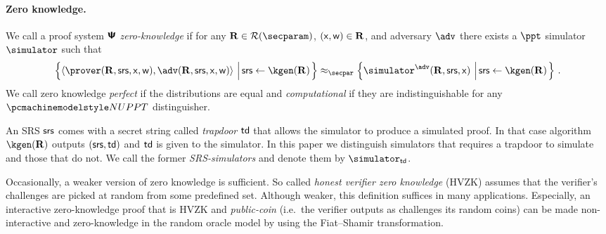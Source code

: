 \documentclass[runningheads,11pt]{llncs}
\begin{document}
 \paragraph{Zero knowledge.}
 We call a proof system $\bm{\mathsf{\Psi}}$ \emph{zero-knowledge} if for any
 $\REL \in \RELGEN(\secparam)$, $(\mathsf{x}, \mathsf{w}) \in \mathbf{R}$, and adversary $\adv$
 there exists a $\ppt$ simulator $\simulator$ such that
	\begin{multline*}
	  \left\{\ip{\prover(\REL, \srs, \inp, \wit)}{\adv(\REL, \srs, \inp, \wit)}
      \,\left|\, \srs \gets \kgen(\REL)\COMMENT{, (\inp, \wit) \gets \adv(\REL,
          \srs)}\vphantom{\simulator^\adv}\right.\right\} \approx_\secpar
		\left\{\simulator^{\adv}(\REL, \srs, \inp)\,\left|\, \srs \gets
        \kgen(\REL)\COMMENT{, (\inp, \wit) \gets \adv(\REL,
          \srs)}\vphantom{\simulator^\adv}\right.\right\}\,.
\end{multline*}
We call zero knowledge \emph{perfect} if the distributions are equal and
\emph{computational} if they are indistinguishable for any $\nuppt$
distinguisher.

An SRS $\mathsf{srs}$ comes with a secret string called \emph{trapdoor} $\mathsf{td}$ that
allows the simulator to produce a simulated proof. In that case algorithm
$\kgen(\REL)$ outputs $(\mathsf{srs}, \mathsf{td})$ and $\mathsf{td}$ is given to the simulator. In this
paper we distinguish simulators that requires a trapdoor to simulate and those
that do not. We call the former \emph{SRS-simulators} and denote them by
$\simulator_\td$.

Occasionally, a weaker version of zero knowledge is sufficient. So called
\emph{honest verifier zero knowledge} (HVZK) assumes that the verifier's
challenges are picked at random from some predefined set. Although weaker, this
definition suffices in many applications. Especially, an interactive
zero-knowledge proof that is HVZK and \emph{public-coin} (i.e.~the verifier
outputs as challenges its random coins) can be made non-interactive and
zero-knowledge in the random oracle model by using the Fiat--Shamir
transformation.
\end{document}
